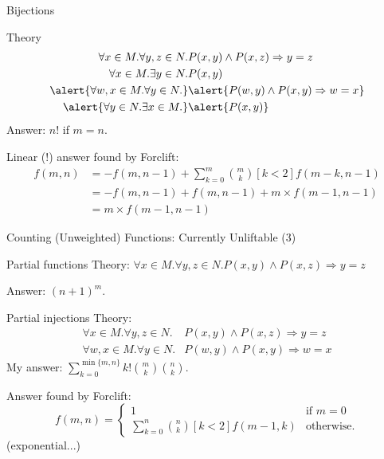 \documentclass{beamer}
\begin{document}
\begin{frame}{Bijections}
  \begin{block}{Theory}
    \begin{align*}
      \forall x \in M. \forall y, z \in N. &P(x, y) \land P(x, z) \Rightarrow y=z \\
      \forall x \in M. \exists y \in N. &P(x, y) \\
      \alert{\forall w, x \in M. \forall y \in N.} &\alert{P(w, y) \land P(x, y) \Rightarrow w=x} \\
      \alert{\forall y \in N. \exists x \in M.} &\alert{P(x, y)}
    \end{align*}
    Answer: $n!$ if $m=n$.
  \end{block}
  \alert{Linear (!) answer found by Forclift:}
  \begin{align*}
    f(m, n) &= - f(m, n-1) + \sum_{k=0}^m \binom{m}{k}[k < 2]f(m - k, n - 1) \\
    &= - f(m, n-1) + f(m, n - 1) + m \times f(m - 1, n - 1) \\
    &= m \times f(m - 1, n - 1)
  \end{align*}
\end{frame}

\begin{frame}{Counting (Unweighted) Functions: Currently Unliftable (3)}
  \begin{block}{Partial functions}
    Theory: $\forall x \in M. \forall y, z \in N. P(x, y) \land P(x, z)
    \Rightarrow y=z$

    Answer: $(n+1)^m$.
  \end{block}
  \begin{block}{Partial injections}
    Theory:
    \begin{align*}
      \forall x \in M. \forall y, z \in N. &P(x, y) \land P(x, z) \Rightarrow y=z \\
      \forall w, x \in M. \forall y \in N. &P(w, y) \land P(x, y) \Rightarrow w=x
    \end{align*}
    My answer: $\sum_{k=0}^{\min\{m, n\}} k!\binom{m}{k}\binom{n}{k}$.

    \pause
    \alert{Answer found by Forclift:}
    \[
    f(m, n) =
    \begin{cases}
      1 & \text{if } m = 0 \\
      \sum_{k=0}^n \binom{n}{k} [k < 2] f(m-1, k) & \text{otherwise.}
    \end{cases}
    \]
    (exponential...)
  \end{block}
\end{frame}
\end{document}
